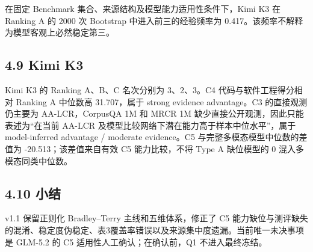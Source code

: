 在固定 Benchmark 集合、来源结构及模型能力适用性条件下，Kimi K3 在 Ranking A 的 2000 次 Bootstrap 中进入前三的经验频率为 0.417。该频率不解释为模型客观上必然稳定第三。

\subsection{4.9 Kimi K3}
Kimi K3 的 Ranking A、B、C 名次分别为 3、2、3。C4 代码与软件工程得分相对 Ranking A 中位数高 31.707，属于 strong evidence advantage。C3 的直接观测仍主要为 AA-LCR，CorpusQA 1M 和 MRCR 1M 缺少直接公开观测，因此只能表述为“在当前 AA-LCR 及模型比较网络下潜在能力高于样本中位水平”，属于 model-inferred advantage / moderate evidence。C5 与完整多模态模型中位数的差值为 -20.513；该差值来自有效 C5 能力比较，不将 Type A 缺位模型的 0 混入多模态同类中位数。

\subsection{4.10 小结}
v1.1 保留正则化 Bradley--Terry 主线和五维体系，修正了 C5 能力缺位与测评缺失的混淆、稳定度伪稳定、表3覆盖率错误以及来源集中度遗漏。当前唯一未决事项是 GLM-5.2 的 C5 适用性人工确认；在确认前，Q1 不进入最终冻结。
